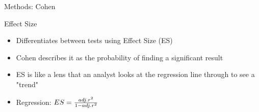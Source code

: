 \begin{frame}{Methods: Cohen}
			\begin{block}{Effect Size}
				\begin{itemize}
					\item Differentiates between tests using Effect  Size (ES)
					\item Cohen describes it as the probability of finding a significant result
					\item ES is like a lens that an analyst looks  at the regression line through to see a "trend" %
					\item Regression: $ES = {adj. r^2 \over {1-adj. r^2}}$ %
				\end{itemize}
			\end{block}
		\end{frame}
